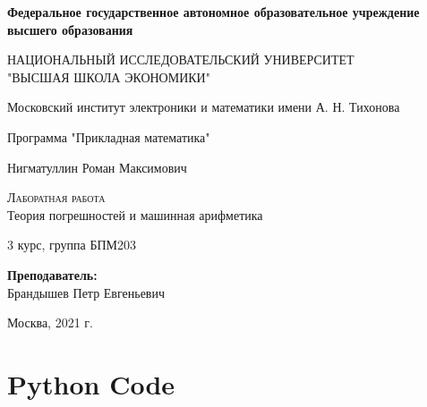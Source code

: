\documentclass{article}
\newenvironment{pseudolisting}
 {\begin{minipage}{\linewidth}\vspace*{\topsep}}
 {\vspace*{\topsep}\end{minipage}}
\begin{document}
\begin{titlepage}
  \begin{center}
    \large
     
    \textbf{Федеральное государственное автономное образовательное учреждение высшего образования}
    \vspace{0.5cm}
 
    НАЦИОНАЛЬНЫЙ ИССЛЕДОВАТЕЛЬСКИЙ УНИВЕРСИТЕТ \\ "ВЫСШАЯ ШКОЛА ЭКОНОМИКИ"
    \vspace{0.5cm}
     
    Московский институт электроники и математики имени А. Н. Тихонова 
     
    Программа "Прикладная математика"
    \vfill
     
     
    Нигматуллин Роман Максимович
    \vfill
 
    \textsc{Лаборатная работа}\\[5mm]
     
    {\LARGE Теория погрешностей и машинная арифметика\\[2mm]
    }
  \bigskip
     
    3 курс, группа БПМ203
\end{center}
\vfill
 

 
\hfill\begin{flushright}
  \textbf{Преподаватель:}\\
  Брандышев Петр Евгеньевич
\end{flushright}%
\vfill
 
\begin{center}
  Москва, 2021 г.
\end{center}
\end{titlepage}

\section{Python Code}

\begin{pseudolisting}
\inputminted{python}{series.py}
\end{pseudolisting}
\end{document}
